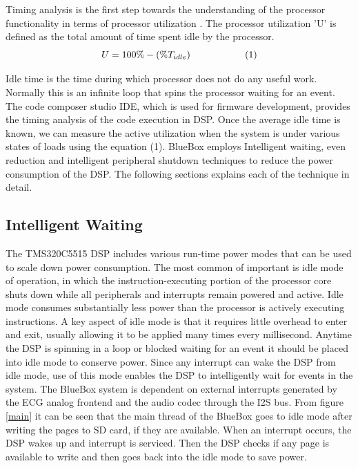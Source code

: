  Timing analysis is the first step towards the understanding of the processor functionality in terms of processor utilization \cite{sastra}. The processor utilization 'U' is defined as the total amount of time spent idle by the processor. 
\[ U = 100\% - (\% T_{idle}) \hspace{20mm} (1)\]

 Idle time is the time during which processor does not do any useful work. Normally this is an infinite loop that spins the processor waiting for an event. The code composer studio IDE, which is used for firmware development, provides the timing analysis of the code execution in DSP. Once the average idle time is known, we can measure the active utilization when the system is under various states of loads using the equation (1). BlueBox employs Intelligent waiting, even reduction and intelligent peripheral shutdown techniques to reduce the power consumption of the DSP. The following sections explains each of the technique in detail. 

\subsection{Intelligent Waiting}
The TMS320C5515 DSP includes various run-time power modes that can be used to scale down power consumption. The most common of important is idle mode of operation, in which the instruction-executing portion of the processor core shuts down while all peripherals and interrupts remain powered and active. Idle mode consumes substantially less power than the processor is actively executing instructions. A key aspect of idle mode is that it requires little overhead to enter and exit, usually allowing it to be applied many times every millisecond. Anytime the DSP is spinning in a loop or blocked waiting for an event it should be placed into idle mode to conserve power. Since any interrupt can wake the DSP from idle mode, use of this mode enables the DSP to intelligently wait for events in the system. The BlueBox system is dependent on external interrupts generated by the ECG analog frontend and the audio codec through the I2S bus. From figure \ref{main} it can be seen that the main thread of the BlueBox goes to idle mode after writing the pages to SD card, if they are available. When an interrupt occurs, the DSP wakes up and interrupt is serviced. Then the DSP checks if any page is available to write and then goes back into the idle mode to save power. 


